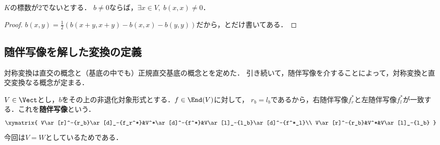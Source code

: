 \documentclass[uplatex, dvipdfmx]{jsreport}
\begin{document}
\begin{lemma}
    $K$の標数が$2$でないとする．
    $b\ne 0$ならば，$\exists x\in V,\;b(x,x)\ne 0$．
\end{lemma}
\begin{proof}
    $b(x,y)=\frac{1}{2}(b(x+y,x+y)-b(x,x)-b(y,y))$だから，とだけ書いてある．
\end{proof}

\subsection{随伴写像を解した変換の定義}

\begin{tcolorbox}[colframe=ForestGreen, colback=ForestGreen!10!white, breakable]
    対称変換は直交の概念と（基底の中でも）正規直交基底の概念とを定めた．
    引き続いて，随伴写像を介することによって，対称変換と直交変換なる概念が定まる．
\end{tcolorbox}

\begin{definition}
    $V\in\Vect$とし，$b$をその上の非退化対象形式とする．$f\in\End(V)$に対して，
    $r_b=l_b$であるから，右随伴写像$f^*_r$と左随伴写像$f^*_l$が一致する．これを\textbf{随伴写像}という．
    \[\xymatrix{
        V\ar[r]^-{r_b}\ar[d]_-{f_r^*}&V^*\ar[d]^-{f^*}&V\ar[l]_-{l_b}\ar[d]^-{f^*_l}\\
        V\ar[r]^-{r_b}&V^*&V\ar[l]_-{l_b}
    }\]
    今回は$V=W$としているためである．
\end{definition}
\end{document}
